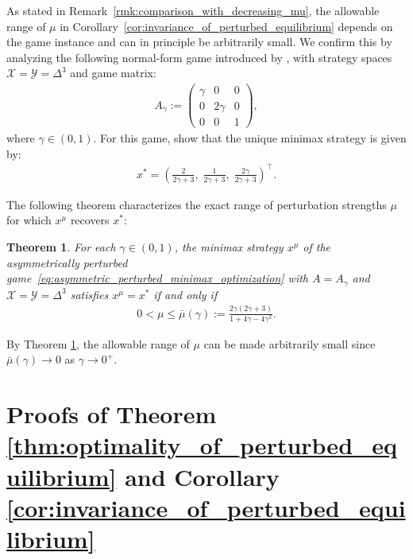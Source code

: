 \documentclass{article}
\newcommand{\X}{\mathcal{X}}
\newcommand{\Y}{\mathcal{Y}}
\theoremstyle{plain}
\newtheorem{theorem}{Theorem}[section]
\begin{document}
As stated in Remark~\ref{rmk:comparison_with_decreasing_mu}, the allowable range of $\mu$ in Corollary~\ref{cor:invariance_of_perturbed_equilibrium} depends on the game instance and can in principle be arbitrarily small.
We confirm this by analyzing the following normal-form game introduced by \citet{anagnostides2024convergence}, with strategy spaces $\X = \Y = \Delta^3$ and game matrix:
\begin{align*}
    A_\gamma := \begin{pmatrix}
        \gamma & 0      & 0 \\
        0      & 2\gamma & 0 \\
        0      & 0      & 1
    \end{pmatrix},
\end{align*}
where $\gamma \in (0, 1)$.
For this game, \citet{anagnostides2024convergence} show that the unique minimax strategy is given by:
\begin{align*}
    x^\ast = \left(\frac{2}{2\gamma+3},\; \frac{1}{2\gamma+3},\; \frac{2\gamma}{2\gamma+3}\right)^{\top}.
\end{align*}

The following theorem characterizes the exact range of perturbation strengths $\mu$ for which $x^\mu$ recovers $x^\ast$:
\begin{theorem}
    \label{thm:arbitrarily_small_allowable_range}
    For each $\gamma \in (0, 1)$, the minimax strategy $x^\mu$ of the asymmetrically perturbed game~\eqref{eq:asymmetric_perturbed_minimax_optimization} with $A = A_\gamma$ and $\X = \Y = \Delta^3$ satisfies $x^\mu = x^\ast$ if and only if
    \begin{align*}
        0 < \mu \leq \bar{\mu}(\gamma) := \frac{2\gamma(2\gamma + 3)}{1 + 4\gamma - 4\gamma^2}.
    \end{align*}
\end{theorem}

By Theorem \ref{thm:arbitrarily_small_allowable_range}, the allowable range of $\mu$ can be made arbitrarily small since $\bar{\mu}(\gamma) \to 0$ as $\gamma \to 0^+$.


\section{Proofs of Theorem \ref{thm:optimality_of_perturbed_equilibrium} and Corollary \ref{cor:invariance_of_perturbed_equilibrium}}
\label{sec:appx_proof_for_optimality}
\end{document}
